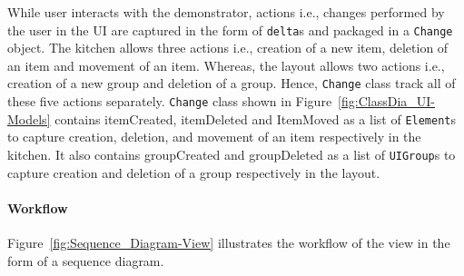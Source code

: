 While user interacts with the demonstrator, actions i.e., changes performed by the user in the UI are captured in the form of \texttt{delta}s and packaged in a \texttt{Change} object. The kitchen allows three actions i.e., creation of a new item, deletion of an item and movement of an item. Whereas, the layout allows two actions i.e., creation of a new group and deletion of a group. Hence, \texttt{Change} class track all of these five actions separately. \texttt{Change} class shown in Figure~\ref{fig:ClassDia_UI-Models} contains itemCreated, itemDeleted and ItemMoved as a list of \texttt{Element}s to capture creation, deletion, and movement of an item respectively in the kitchen. It also contains groupCreated and groupDeleted as a list of \texttt{UIGroup}s to capture creation and deletion of a group respectively in the layout.

\paragraph{Workflow}
Figure~\ref{fig:Sequence_Diagram-View} illustrates the workflow of the view in the form of a sequence diagram.

